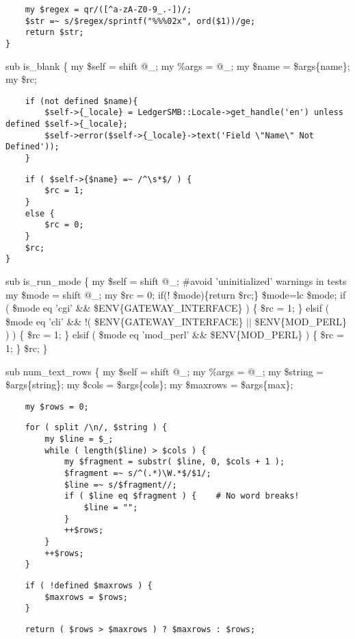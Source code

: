 \begin{verbatim}
    my $regex = qr/([^a-zA-Z0-9_.-])/;
    $str =~ s/$regex/sprintf("%%%02x", ord($1))/ge;
    return $str;
}
\end{verbatim}


sub is\_blank \{
    my \$self = shift @\_;
    my \%args = @\_;
    my \$name = \$args\{name\};
    my \$rc;

\begin{verbatim}
    if (not defined $name){
        $self->{_locale} = LedgerSMB::Locale->get_handle('en') unless defined $self->{_locale};
        $self->error($self->{_locale}->text('Field \"Name\" Not Defined'));
    }
\end{verbatim}
\begin{verbatim}
    if ( $self->{$name} =~ /^\s*$/ ) {
        $rc = 1;
    }
    else {
        $rc = 0;
    }
    $rc;
}
\end{verbatim}


sub is\_run\_mode \{
    my \$self = shift @\_;
    \#avoid 'uninitialized' warnings in tests
    my \$mode = shift @\_;
    my \$rc   = 0;
    if(! \$mode)\{return \$rc;\}
    \$mode=lc \$mode;
    if ( \$mode eq 'cgi' \&\& \$ENV\{GATEWAY\_INTERFACE\} ) \{
        \$rc = 1;
    \}
    elsif ( \$mode eq 'cli' \&\& !( \$ENV\{GATEWAY\_INTERFACE\} $|$$|$ \$ENV\{MOD\_PERL\} ) ) \{
        \$rc = 1;
    \}
    elsif ( \$mode eq 'mod\_perl' \&\& \$ENV\{MOD\_PERL\} ) \{
        \$rc = 1;
    \}
    \$rc;
\}



sub num\_text\_rows \{
    my \$self    = shift @\_;
    my \%args    = @\_;
    my \$string  = \$args\{string\};
    my \$cols    = \$args\{cols\};
    my \$maxrows = \$args\{max\};

\begin{verbatim}
    my $rows = 0;
\end{verbatim}
\begin{verbatim}
    for ( split /\n/, $string ) {
        my $line = $_;
        while ( length($line) > $cols ) {
            my $fragment = substr( $line, 0, $cols + 1 );
            $fragment =~ s/^(.*)\W.*$/$1/;
            $line =~ s/$fragment//;
            if ( $line eq $fragment ) {    # No word breaks!
                $line = "";
            }
            ++$rows;
        }
        ++$rows;
    }
\end{verbatim}
\begin{verbatim}
    if ( !defined $maxrows ) {
        $maxrows = $rows;
    }
\end{verbatim}
\begin{verbatim}
    return ( $rows > $maxrows ) ? $maxrows : $rows;
\end{verbatim}


